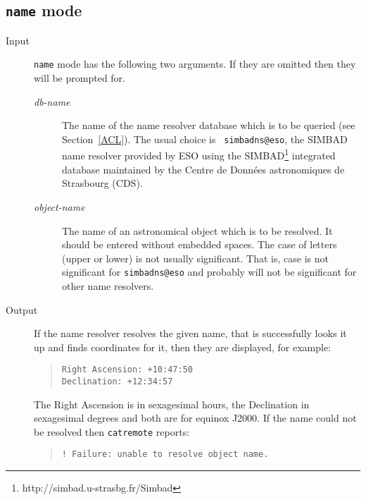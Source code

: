 \documentclass[twoside,11pt]{article}
\newcommand{\htmladdnormallinkfoot}[2]{#1\footnote{#2}}
\newcommand{\htmladdnormallink}[2]{#1}
\renewcommand{\_}{\texttt{\symbol{95}}}
\begin{document}
\subsection{{\tt name} mode}

\begin{description}

  \item[Input] {\tt name} mode has the following two arguments.  If they
   are omitted then they will be prompted for.

  \begin{description}

    \item[{\it db-name}\/] The name of the name resolver database which
     is to be queried (see Section~\ref{ACL}).  The usual choice is {\tt
     simbad\_ns@eso}, the SIMBAD name resolver provided by ESO using the
     \htmladdnormallinkfoot{SIMBAD}{http://simbad.u-strasbg.fr/Simbad}
     integrated database maintained by the 
     \htmladdnormallink{Centre de Donn\'{e}es astronomiques de Strasbourg}
     {http://cdsweb.u-strasbg.fr/CDS.html} (CDS).

    \item[{\it object-name}] The name of an astronomical object which is
     to be resolved.  It should be entered without embedded spaces.  The
     case of letters (upper or lower) is not usually significant.  That
     is, case is not significant for {\tt simbad\_ns@eso} and probably
     will not be significant for other name resolvers.

  \end{description}

  \item[Output] If the name resolver resolves the given name, that is
   successfully looks it up and finds coordinates for it, then they are
   displayed, for example:

  \begin{quote}
   \verb=Right Ascension: +10:47:50= \\
   \verb=Declination: +12:34:57=
  \end{quote}

   The Right Ascension is in sexagesimal hours, the Declination in
   sexagesimal degrees and both are for equinox J2000.  If the name
   could not be resolved then {\tt catremote} reports:

  \begin{quote}
   \verb=! Failure: unable to resolve object name.=
  \end{quote}

\end{description}
\end{document}
